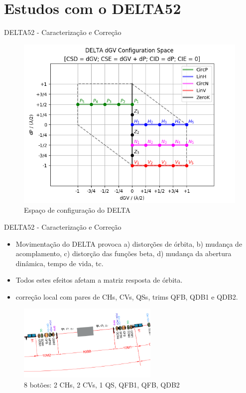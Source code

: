 \documentclass{beamer}					  %
\begin{document}
\section{Estudos com o DELTA52}

\begin{frame}{DELTA52 - Caracterização e Correção}
    \begin{figure}[H]
    		\centering
            \includegraphics[width=.8\textwidth]{2023-12-12/figures/id-delta-dgv-config-space.png}
            \caption{Espaço de configuração do DELTA}
            \label{fig:delta-config-space}
    \end{figure}
\end{frame}

\begin{frame}{DELTA52 - Caracterização e Correção}
    \begin{itemize}
    		\item Movimentação do DELTA provoca a) distorções de órbita, b) mudança de acomplamento, c) distorção das funções beta, d) mudança da abertura dinâmica, tempo de vida, tc.
            \item Todos estes efeitos afetam a matriz resposta de órbita.
            \item correção local com pares de CHs, CVs, QSs, trims QFB, QDB1 e QDB2.
    \end{itemize}
    \begin{figure}[H]
        	\centering
            \includegraphics[width=0.6\textwidth]{2023-12-12/figures/si-10sb-2.png}
            \caption{\small{8 botões: 2 CHs, 2 CVs, 1 QS, QFB1, QFB, QDB2}}
            \label{fig:bba}
    \end{figure}
\end{frame}
\end{document}
